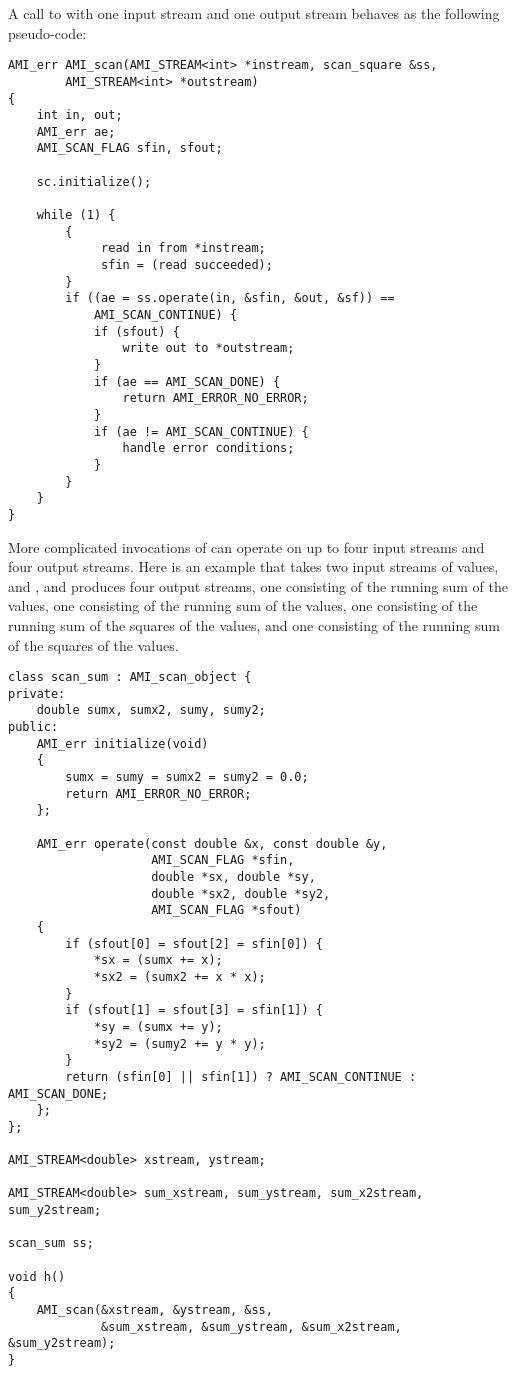 A call to  with one input stream and one output stream
behaves as the following pseudo-code:

\begin{verbatim} 
AMI_err AMI_scan(AMI_STREAM<int> *instream, scan_square &ss, 
        AMI_STREAM<int> *outstream)
{
    int in, out;
    AMI_err ae;    
    AMI_SCAN_FLAG sfin, sfout;

    sc.initialize();

    while (1) {
        {
             read in from *instream;
             sfin = (read succeeded);
        }
        if ((ae = ss.operate(in, &sfin, &out, &sf)) == 
            AMI_SCAN_CONTINUE) {
            if (sfout) {
                write out to *outstream;
            }
            if (ae == AMI_SCAN_DONE) {
                return AMI_ERROR_NO_ERROR;
            }
            if (ae != AMI_SCAN_CONTINUE) {
                handle error conditions;
            }
        }
    }
}
\end{verbatim}

More complicated invocations of  can operate on up
to four input streams and four output streams.  Here is an example
that takes two input streams of values,  and , and
produces four output streams, 
one consisting of the running sum of the
 values,
one consisting of the running sum of the
 values,
one consisting of the running sum of the
squares of the  values,
and
one consisting of the running sum of the
squares of the  values.

\begin{verbatim}
class scan_sum : AMI_scan_object {
private:
    double sumx, sumx2, sumy, sumy2;
public:
    AMI_err initialize(void)
    {
        sumx = sumy = sumx2 = sumy2 = 0.0;
        return AMI_ERROR_NO_ERROR;
    };

    AMI_err operate(const double &x, const double &y, 
                    AMI_SCAN_FLAG *sfin,
                    double *sx, double *sy, 
                    double *sx2, double *sy2, 
                    AMI_SCAN_FLAG *sfout)
    {
        if (sfout[0] = sfout[2] = sfin[0]) {
            *sx = (sumx += x);
            *sx2 = (sumx2 += x * x);
        }
        if (sfout[1] = sfout[3] = sfin[1]) {
            *sy = (sumx += y);
            *sy2 = (sumy2 += y * y);
        }        
        return (sfin[0] || sfin[1]) ? AMI_SCAN_CONTINUE : AMI_SCAN_DONE;
    };
};

AMI_STREAM<double> xstream, ystream;

AMI_STREAM<double> sum_xstream, sum_ystream, sum_x2stream, sum_y2stream;

scan_sum ss;

void h()
{
    AMI_scan(&xstream, &ystream, &ss, 
             &sum_xstream, &sum_ystream, &sum_x2stream, &sum_y2stream);
}
\end{verbatim}


